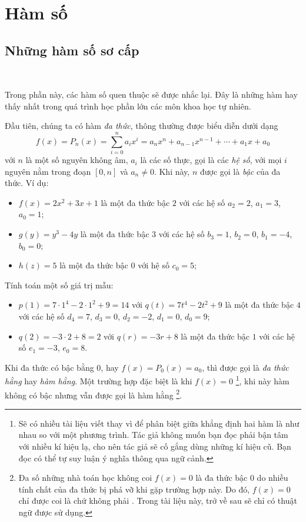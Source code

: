 \section{Hàm số}



\subsection{Những hàm số sơ cấp}

\ %

Trong phần này, các hàm số quen thuộc sẽ được nhắc lại. Đây là những hàm hay thấy nhất trong quá trình học phần lớn các môn khoa học tự nhiên.

Đầu tiên, chúng ta có hàm \emph{đa thức}, thông thường được biểu diễn dưới dạng $$f(x)=P_n(x)=\sum_{i = 0}^n a_i x^i = a_nx^n + a_{n-1}x^{n-1} + \cdots + a_1x + a_0$$ với $n$ là một số nguyên không âm, $a_i$ là các số thực, gọi là các \emph{hệ số}, với mọi $i$ nguyên nằm trong đoạn $[0, n]$ và $a_n \neq 0$. Khi này, $n$ được gọi là \emph{bậc} của đa thức. Ví dụ:
\begin{itemize}
   \item $f(x) = 2x^2 + 3x + 1$ là một đa thức bậc $2$ với các hệ số $a_2 = 2$, $a_1 = 3$, $a_0 = 1$;
   \item $g(y) = y^3 - 4y$ là một đa thức bậc $3$ với các hệ số $b_3 = 1$, $b_2 = 0$, $b_1 = -4$, $b_0 = 0$;
   \item $h(z) = 5$ là một đa thức bậc $0$ với hệ số $c_0 = 5$;
\end{itemize}
Tính toán một số giá trị mẫu:
\begin{itemize}
   \item $p(1) = 7 \cdot 1^4 - 2 \cdot 1^2 + 9 = 14$ với $q(t)= 7t^4 - 2t^2 + 9$ là một đa thức bậc $4$ với các hệ số $d_4 = 7$, $d_3 = 0$, $d_2 = -2$, $d_1 = 0$, $d_0 = 9$;
   \item $q(2) = -3 \cdot 2 + 8 = 2$ với $q(r) = -3r + 8$ là một đa thức bậc $1$ với các hệ số $e_1 = -3$, $e_0 = 8$.
\end{itemize}
Khi đa thức có bậc bằng $0$, hay $f(x) = P_0(x) = a_0$, thì được gọi là \emph{đa thức hằng} hay \emph{hàm hằng}. Một trường hợp đặc biệt là khi $f(x) = 0$ \footnote{Sẽ có nhiều tài liệu viết  thay vì  để phân biệt giữa khẳng định hai hàm là như nhau so với một phương trình. Tác giả không muốn bạn đọc phải bận tâm với nhiều kí hiệu lạ, cho nên tác giả sẽ cố gắng dùng những kí hiệu cũ. Bạn đọc có thể tự suy luận ý nghĩa thông qua ngữ cảnh.}, khi này hàm không có bậc nhưng vẫn được gọi là hàm hằng \footnote{Đa số những nhà toán học không coi $f(x) = 0$ là đa thức bậc $0$ do nhiều tính chất của đa thức bị phá vỡ khi gặp trường hợp này. Do đó, $f(x) = 0$ chỉ được coi là  chứ không phải . Trong tài liệu này, trở về sau sẽ chỉ có thuật ngữ  được sử dụng.}.

